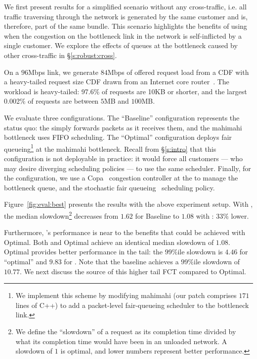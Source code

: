 
We first present results for a simplified scenario without any cross-traffic, i.e. all traffic traversing through the network is generated by the same customer and is, therefore, part of the same bundle. 
This scenario highlights the benefits of using \name when the congestion on the bottleneck link in the network is self-inflicted by a single customer. We explore the effects of queues at the bottleneck caused by other cross-traffic in \S\ref{s:robust:cross}.

On a $96$Mbps link, we generate $84$Mbps of offered request load from a CDF with a heavy-tailed request size CDF drawn from an Internet core router~\cite{caida-dataset}.
The workload is heavy-tailed: 97.6\% of requests are 10KB or shorter, and the largest 0.002\% of requests are between $5$MB and $100$MB.

We evaluate three configurations. 
The ``Baseline'' configuration represents the status quo: the \inbox simply forwards packets as it receives them, and the mahimahi bottleneck uses FIFO scheduling.
The ``Optimal'' configuration deploys fair queueing\footnote{
We implement this scheme by modifying mahimahi (our patch comprises $171$ lines of C++) to add a packet-level fair-queueing scheduler to the bottleneck link.}
at the mahimahi bottleneck. 
Recall from \S\ref{s:intro} that this configuration is not deployable in practice: it would force all customers --- who may desire diverging scheduling policies --- to use the same scheduler.
Finally, for the \name configuration, we use a Copa~\cite{copa} congestion controller at the \inbox to manage the bottleneck queue, and the stochastic fair queueing~\cite{sfq} scheduling policy. 

Figure~\ref{fig:eval:best} presents the results with the above experiment setup.
With \name, the median 
slowdown\footnote{We define the ``slowdown'' of a request as its completion time divided by what its completion time would have been in an unloaded network. A slowdown of $1$ is optimal, and lower numbers represent better performance.} 
decreases from $1.62$ for Baseline to $1.08$ with \name: 33\% lower.

Furthermore, \name's performance is near to the benefits that could be achieved with Optimal.
Both \name and Optimal achieve an identical median slowdown of $1.08$.
Optimal provides better performance in the tail: the $99\%$ile slowdown is $4.46$ for ``optimal'' and $9.83$ for \name.
Note that the baseline achieves a $99\%$ile slowdown of $10.77$.
We next discuss the source of this higher tail FCT compared to Optimal.

